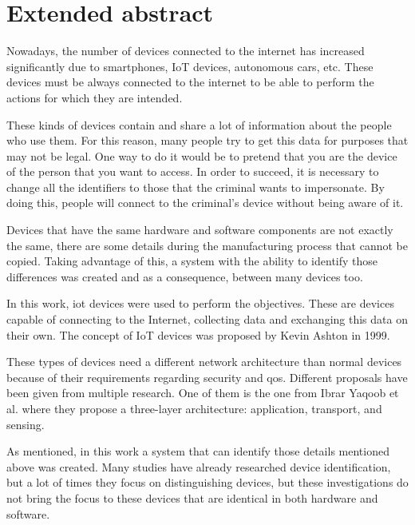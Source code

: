
\chapter*{Extended abstract}
 \label{chap:abstract}

Nowadays, the number of devices connected to the internet has increased significantly due to smartphones, IoT devices, autonomous cars, etc. These devices must be always connected to the internet to be able to perform the actions for which they are intended. 

These kinds of devices contain and share a lot of information about the people who use them. For this reason, many people try to get this data for purposes that may not be legal. One way to do it would be to pretend that you are the device of the person that you want to access. In order to succeed, it is necessary to change all the identifiers to those that the criminal wants to impersonate. By doing this, people will connect to the criminal's device without being aware of it.


Devices that have the same hardware and software components are not exactly the same, there are some details during the manufacturing process that cannot be copied. Taking advantage of this, a system with the ability to identify those differences was created and as a consequence, between many devices too.

In this work, \acrfull{iot} devices were used to perform the objectives. These are devices capable of connecting to the Internet, collecting data and exchanging this data on their own. The concept of IoT devices was proposed by Kevin Ashton in 1999.

These types of devices need a different network architecture than normal devices because of their requirements regarding security and \acrfull{qos}. Different proposals have been given from multiple research. One of them is the one from Ibrar Yaqoob et al. \cite{yaqoob2017internet} where they propose a three-layer architecture: application, transport, and sensing.

As mentioned, in this work a system that can identify those details mentioned above was created. Many studies have already researched device identification, but a lot of times they focus on distinguishing devices, but these investigations do not bring the focus to these devices that are identical in both hardware and software.

